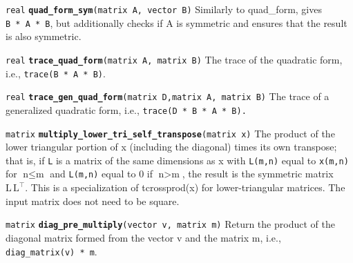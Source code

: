 \documentclass[
  10pt,
]{book}
\begin{document}

\texttt{real} \textbf{\texttt{quad\_form\_sym}}\texttt{(matrix\ A,\ vector\ B)}\newline
Similarly to quad\_form, gives \texttt{B\textquotesingle{}\ *\ A\ *\ B}, but additionally checks if
A is symmetric and ensures that the result is also symmetric.


\texttt{real} \textbf{\texttt{trace\_quad\_form}}\texttt{(matrix\ A,\ matrix\ B)}\newline
The trace of the quadratic form, i.e., \texttt{trace(B\textquotesingle{}\ *\ A\ *\ B)}.


\texttt{real} \textbf{\texttt{trace\_gen\_quad\_form}}\texttt{(matrix\ D,matrix\ A,\ matrix\ B)}\newline
The trace of a generalized quadratic form, i.e., \texttt{trace(D\ *\ B\textquotesingle{}\ *\ A\ *\ B).}


\texttt{matrix} \textbf{\texttt{multiply\_lower\_tri\_self\_transpose}}\texttt{(matrix\ x)}\newline
The product of the lower triangular portion of x (including the
diagonal) times its own transpose; that is, if \texttt{L} is a matrix of the
same dimensions as x with \texttt{L(m,n)} equal to \texttt{x(m,n)} for \(\text{n} \leq \text{m}\) and \texttt{L(m,n)} equal to 0 if \(\text{n} > \text{m}\), the
result is the symmetric matrix \(\text{L}\,\text{L}^{\top}\). This is a
specialization of tcrossprod(x) for lower-triangular matrices. The
input matrix does not need to be square.


\texttt{matrix} \textbf{\texttt{diag\_pre\_multiply}}\texttt{(vector\ v,\ matrix\ m)}\newline
Return the product of the diagonal matrix formed from the vector v and
the matrix m, i.e., \texttt{diag\_matrix(v)\ *\ m}.

\end{document}
